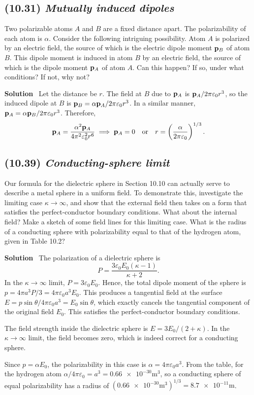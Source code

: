 \documentclass[hidelinks]{article}
\begin{document}
\subsection{(10.31) \textit{Mutually induced dipoles}}
Two polarizable atoms $A$ and $B$ are a fixed distance apart. The polarizability of each atom is $\alpha$. Consider the following intriguing possibility. Atom $A$ is polarized by an electric field, the source of which is the electric dipole moment $\vb{p}_B$ of atom $B$. This dipole moment is induced in atom $B$ by an electric field, the source of which is the dipole moment $\vb{p}_A$ of atom $A$. Can this happen? If so, under what conditions? If not, why not?

\vspace{5mm}
\noindent
\textbf{Solution} \, Let the distance be $r$. The field at $B$ due to $\vb{p}_A$ is $\vb{p}_A/2\pi\varepsilon_0r^3$, so the induced dipole at $B$ is $\vb{p}_B = \alpha\vb{p}_A/2\pi\varepsilon_0r^3$. In a similar manner, $\vb{p}_A = \alpha\vb{p}_B/2\pi\varepsilon_0r^3$. Therefore,
$$\vb{p}_A = \frac{\alpha^2\vb{p}_A}{4\pi^2\varepsilon_0^2r^6} \implies \vb{p}_A=0 \quad \text{or} \quad r= \left(\frac{\alpha}{2\pi\varepsilon_0}\right)^{1/3}.$$

\subsection{(10.39) \textit{Conducting-sphere limit}}
Our formula for the dielectric sphere in Section 10.10 can actually serve to describe a metal sphere in a uniform field. To demonstrate this, investigate the limiting case $\kappa \to \infty$, and show that the external field then takes on a form that satisfies the perfect-conductor boundary conditions. What about the internal field? Make a sketch of some field lines for this limiting case. What is the radius of a conducting sphere with polarizability equal to that of the hydrogen atom, given in Table 10.2?

\vspace{5mm}
\noindent
\textbf{Solution} \, The polarization of a dielectric sphere is 
$$P = \frac{3\varepsilon_0E_0(\kappa-1)}{\kappa + 2}.$$ 
In the $\kappa \to \infty$ limit, $P = 3 \varepsilon_0 E_0$. Hence, the total dipole moment of the sphere is $p = 4\pi a^3P/3 = 4\pi \varepsilon_0 a^3 E_0$. This produces a tangential field at the surface $E = p \sin \theta/4\pi \varepsilon_0a^3 = E_0 \sin \theta$, which exactly cancels the tangential component of the original field $E_0$. This satisfies the perfect-conductor boundary conditions.

The field strength inside the dielectric sphere is $E= 3E_0/(2+\kappa)$. In the $\kappa \to \infty$ limit, the field becomes zero, which is indeed correct for a conducting sphere.

Since $p=\alpha E_0$, the polarizability in this case is $\alpha = 4\pi\varepsilon_0a^3$. From the table, for the hydrogen atom $\alpha/4\pi\varepsilon_0 = a^3 = \num{0.66e-30}\si{\m \cubed}$, so a conducting sphere of equal polarizability has a radius of $(\num{0.66e-30}\si{\m \cubed})^{1/3} = \num{8.7e-11}\si{\m }$.
\end{document}
